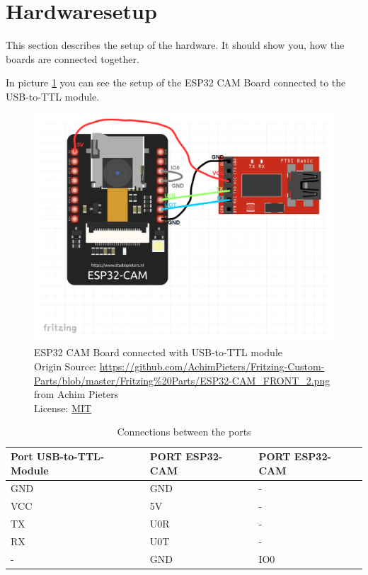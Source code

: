 \graphicspath{ {./hardware_installation/pictures/} }
\section{Hardwaresetup}
This section describes the setup of the hardware. It should show you,
how the boards are connected together.

In picture \ref{ESP32-CAM-USB-TO-TTL} you can see the setup of the ESP32 CAM Board connected to the USB-to-TTL module.

\begin{figure}[H]
\centering
\includegraphics[width=\textwidth]{esp32_cam-ftdi}
\caption[ESP32 CAM Board connected with USB-to-TTL module]{ESP32 CAM Board connected with USB-to-TTL module \\ Origin Source: \url{https://github.com/AchimPieters/Fritzing-Custom-Parts/blob/master/Fritzing\%20Parts/ESP32-CAM_FRONT_2.png}\\ from Achim Pieters \\ License: \href{https://opensource.org/licenses/MIT}{MIT}}
\label{ESP32-CAM-USB-TO-TTL}
\end{figure}

\begin{table}[H]
\begin{tabular}{|l|l|l|}
\hline
Port USB-to-TTL-Module & PORT ESP32-CAM & PORT ESP32-CAM \\ \hline
GND                    & GND            & -              \\ \hline
VCC                    & 5V             & -              \\ \hline
TX                     & U0R            & -              \\ \hline
RX                     & U0T            & -              \\ \hline
-                      & GND            & IO0            \\ \hline
\end{tabular}
\caption{\label{tab:Port-Connections}Connections between the ports}
\end{table}

